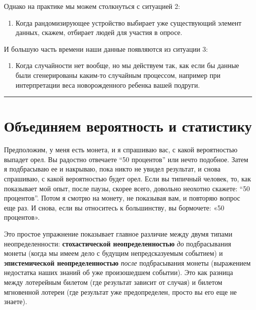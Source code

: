 \documentclass[11pt,a4paper]{article}
\renewcommand{\linethickness}{0.1ex}
\providecommand{\tightlist}{%
      \setlength{\itemsep}{0pt}\setlength{\parskip}{0pt}}
\begin{document}
Однако на практике мы можем столкнуться с ситуацией 2:

\begin{enumerate}
\def\labelenumi{\arabic{enumi}.}
\setcounter{enumi}{1}
\tightlist
\item
  Когда рандомизирующее устройство выбирает уже существующий элемент
  данных, скажем, отбирает людей для участия в опросе.
\end{enumerate}

И большую часть времени наши данные появляются из ситуации 3:

\begin{enumerate}
\def\labelenumi{\arabic{enumi}.}
\setcounter{enumi}{2}
\tightlist
\item
  Когда случайности нет вообще, но мы действуем так, как если бы данные
  были сгенерированы каким-то случайным процессом, например при
  интерпретации веса новорожденного ребенка вашей подруги.
\end{enumerate}

    \begin{center}\rule{0.5\linewidth}{\linethickness}\end{center}

    \hypertarget{ux43eux431ux44aux435ux434ux438ux43dux44fux435ux43c-ux432ux435ux440ux43eux44fux442ux43dux43eux441ux442ux44c-ux438-ux441ux442ux430ux442ux438ux441ux442ux438ux43aux443}{%
\section{Объединяем вероятность и
статистику}\label{ux43eux431ux44aux435ux434ux438ux43dux44fux435ux43c-ux432ux435ux440ux43eux44fux442ux43dux43eux441ux442ux44c-ux438-ux441ux442ux430ux442ux438ux441ux442ux438ux43aux443}}

Предположим, у меня есть монета, и я спрашиваю вас, с какой вероятностью
выпадет орел. Вы радостно отвечаете ``50 процентов'' или нечто подобное.
Затем я подбрасываю ее и накрываю, пока никто не увидел результат, и
снова спрашиваю, с какой вероятностью будет орел. Если вы типичный
человек, то, как показывает мой опыт, после паузы, скорее всего,
довольно неохотно скажете: ``50 процентов''. Потом я смотрю на монету,
не показывая вам, и повторяю вопрос еще раз. И снова, если вы относитесь
к большинству, вы бормочете: «50 процентов».

Это простое упражнение показывает главное различие между двумя типами
неопределенности: \textbf{стохастической неопределенностью} \emph{до}
подбрасывания монеты (когда мы имеем дело с будущим непредсказуемым
событием) и \textbf{эпистемической неопределенностью} \emph{после}
подбрасывания монеты (выражением недостатка наших знаний об уже
произошедшем событии). Это как разница между лотерейным билетом (где
результат зависит от случая) и билетом мгновенной лотереи (где результат
уже предопределен, просто вы его еще не знаете).
\end{document}
